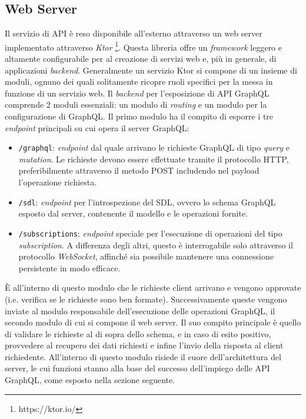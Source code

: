 \subsection{Web Server}\label{ssec:web-server}
Il servizio di \ac{API} è reso disponibile all'esterno attraverso un web server implementato attraverso \textit{Ktor} \footnote{https://ktor.io/}. Questa libreria
offre un \textit{framework} leggero e altamente configurabile per al creazione di servizi web e, più in generale, di applicazioni \textit{backend}. Generalmente un
servizio Ktor si compone di un insieme di moduli, ognuno dei quali solitamente ricopre ruoli specifici per la messa in funzione di un servizio web. Il \textit{backend}
per l'esposizione di \ac{API} GraphQL comprende 2 moduli essenziali: un modulo di \textit{routing} e un modulo per la configurazione di GraphQL.
Il primo modulo ha il compito di esporre i tre \textit{endpoint} principali su cui opera il server GraphQL:
\begin{itemize}
    \item \texttt{/graphql}: \textit{endpoint} dal quale arrivano le richieste GraphQL di tipo \textit{query} e \textit{mutation}. Le richieste devono
        essere effettuate tramite il protocollo HTTP, preferibilmente attraverso il metodo POST includendo nel payload l'operazione richiesta.
    \item \texttt{/sdl}: \textit{endpoint} per l'introspezione del \ac{SDL}, ovvero lo schema GraphQL esposto dal server, contenente il modello e le operazioni fornite.
    \item \texttt{/subscriptions}: \textit{endpoint} speciale per l'esecuzione di operazioni del tipo \textit{subscription}. A differenza degli altri, questo è interrogabile
        solo attraverso il protocollo \textit{WebSocket}, affinché sia possibile mantenere una connessione persistente in modo efficace.
\end{itemize}

È all'interno di questo modulo che le richieste client arrivano e vengono approvate (i.e. verifica se le richieste sono ben formate). Successivamente queste vengono inviate
al modulo responsabile dell'esecuzione delle operazioni GraphQL, il secondo modulo di cui si compone il web server. Il suo compito principale è quello di validare le richieste
al di sopra dello schema, e in caso di esito positivo, provvedere al recupero dei dati richiesti e infine l'invio della risposta al client richiedente. All'interno di questo modulo
risiede il cuore dell'architettura del server, le cui funzioni stanno alla base del successo dell'impiego delle \ac{API} GraphQL, come esposto nella sezione seguente.


